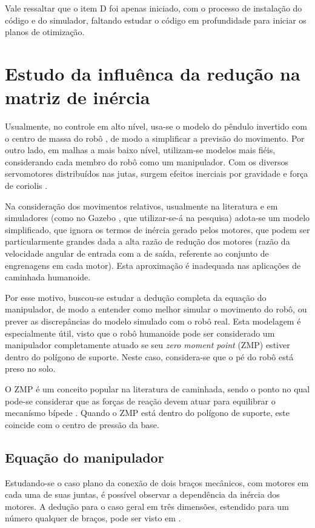 Vale ressaltar que o item D foi apenas iniciado, com o processo de instalação do código e do simulador, faltando estudar o código em profundidade para iniciar os planos de otimização.

\section{Estudo da influênca da redução na matriz de inércia}

Usualmente, no controle em alto nível, usa-se o modelo do pêndulo invertido com o centro de massa do robô \cite{kajita2001}, de modo a simplificar a previsão do movimento. Por outro lado, em malhas a mais baixo nível, utilizam-se modelos mais fiéis, considerando cada membro do robô como um manipulador. Com os diversos servomotores distribuídos nas jutas, surgem efeitos inerciais por gravidade e força de coriolis \cite{craig1986, siciliano2008}.

Na consideração dos movimentos relativos, usualmente na literatura e em simuladores (como no Gazebo \cite{1389727}, que utilizar-se-á na pesquisa) adota-se um modelo simplificado, que ignora os termos de inércia gerado pelos motores, que podem ser particularmente grandes dada a alta razão de redução dos motores (razão da velocidade angular de entrada com a de saída, referente ao conjunto de engrenagens em cada motor). Esta aproximação é inadequada nas aplicações de caminhada humanoide.

Por esse motivo, buscou-se estudar a dedução completa da equação do manipulador, de modo a entender como melhor simular o movimento do robô, ou prever as discrepâncias do modelo simulado com o robô real. Esta modelagem é especialmente útil, visto que o robô humanoide pode ser considerado um manipulador completamente atuado se seu \textit{zero moment point} (ZMP) estiver dentro do polígono de suporte. Neste caso, considera-se que o pé do robô está preso no solo. 

O ZMP é um conceito popular na literatura de caminhada, sendo o ponto no qual pode-se considerar que as forças de reação devem atuar para equilibrar o mecanísmo bípede \cite{vukobratovic2004}. Quando o ZMP está dentro do polígono de suporte, este coincide com o centro de pressão da base.
\subsection{Equação do manipulador}

Estudando-se o caso plano da conexão de dois braços mecânicos, com motores em cada uma de suas juntas, é possível observar a dependência da inércia dos motores. A dedução para o caso geral em três dimensões, estendido para um número qualquer de braços, pode ser visto em \cite{nasareport}. 

